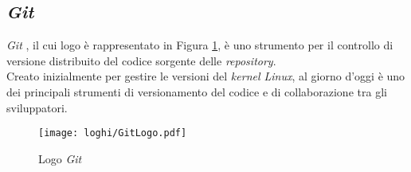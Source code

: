 \subsection*{\textit{Git}}
\label{sec:git}
\noindent \textit{Git} \cite{siteE:wiki}, il cui logo è rappresentato in Figura \ref{logoGit}, è uno strumento per il controllo di versione distribuito del codice sorgente delle \textit{repository}.\\
Creato inizialmente per gestire le versioni del \textit{kernel Linux}, al giorno d'oggi è uno dei principali
strumenti di versionamento del codice e di collaborazione tra gli sviluppatori.
\begin{figure}[!h] 
    \centering 
    \texttt{[image: loghi/GitLogo.pdf]}
    \caption{Logo \textit{Git}}
    \label{logoGit}
\end{figure}